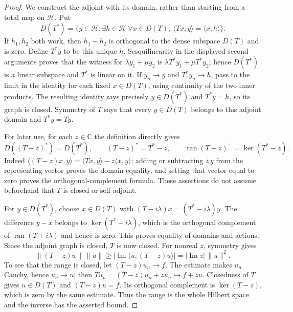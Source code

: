 \documentclass[11pt,a4paper]{article}
\theoremstyle{definition}
\theoremstyle{remark}
\begin{document}
\begin{proof}
We construct the adjoint with its domain, rather than starting from
a total map on $\mathcal H$. Put
\[
 D(T^*)=\{y\in\mathcal H:\exists h\in\mathcal H\ \forall x\in D(T),
                \ \langle Tx,y\rangle=\langle x,h\rangle\}.
\]
If $h_1,h_2$ both work, then $h_1-h_2$ is orthogonal to the dense
subspace $D(T)$ and is zero. Define $T^*y$ to be this unique $h$.
Sesquilinearity in the displayed second arguments proves that the
witness for $\lambda y_1+\mu y_2$ is
$\lambda T^*y_1+\mu T^*y_2$; hence $D(T^*)$ is a linear subspace
and $T^*$ is linear on it. If $y_n\to y$ and $T^*y_n\to h$, pass to
the limit in the identity for each fixed $x\in D(T)$, using continuity
of the two inner products. The resulting identity says precisely
$y\in D(T^*)$ and $T^*y=h$, so its graph is closed. Symmetry of
$T$ says that every $y\in D(T)$ belongs to this adjoint domain and
$T^*y=Ty$.

For later use, for each $z\in\mathbb C$ the definition directly gives
\[
 D((T-z)^*)=D(T^*),\qquad (T-z)^*=T^*-\overline z,
 \qquad
 \operatorname{ran}(T-z)^\perp=\ker(T^*-\overline z).
\]
Indeed $\langle(T-z)x,y\rangle
=\langle Tx,y\rangle-\overline z\langle x,y\rangle$;
adding or subtracting $\overline z\,y$ from the representing vector
proves the domain equality, and setting that vector equal to zero
proves the orthogonal-complement formula. These assertions do not
assume beforehand that $T$ is closed or self-adjoint.

For $y\in D(T^*)$, choose $x\in D(T)$ with
$(T-i\lambda)x=(T^*-i\lambda)y$. The difference $y-x$ belongs to
$\ker(T^*-i\lambda)$, which is the orthogonal complement of
$\operatorname{ran}(T+i\lambda)$ and hence is zero. This proves equality
of domains and actions. Since the adjoint graph is closed, $T$ is now closed. For nonreal $z$, symmetry gives
\[
 \|(T-z)u\|\,\|u\|\geq
 |\operatorname{Im}\langle u,(T-z)u\rangle|
 =|\operatorname{Im}z|\,\|u\|^2.
\]
To see that the range is closed, let $(T-z)u_n\to f$.
The estimate makes $u_n$ Cauchy, hence $u_n\to u$; then
$Tu_n=(T-z)u_n+zu_n\to f+zu$. Closedness of $T$ gives
$u\in D(T)$ and $(T-z)u=f$.
Its orthogonal complement is $\ker(T-\overline z)$, which is zero by
the same estimate. Thus the range is the whole Hilbert space and the
inverse has the asserted bound.
\end{proof}
\end{document}
